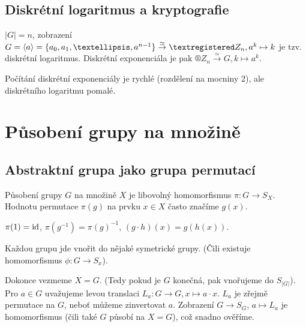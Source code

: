 \documentclass[12pt]{article}                   %
\begin{document}
    \subsection{Diskrétní logaritmus a kryptografie}
        \begin{definice}
            $|G| = n$, zobrazení $G = \<a\> = \{a_0, a_1, …, a^{n-1}\} \overset{\simeq}{\rightarrow} ®Z_n, a^k \mapsto k$ je tzv. diskrétní logaritmus. Diskrétní exponenciála je pak $®Z_n \overset{\simeq}{\rightarrow} G, k \mapsto a^k$.
        \end{definice}

        \begin{poznamka}
            Počítání diskrétní exponenciály je rychlé (rozdělení na mocniny 2), ale diskrétního logaritmu pomalé.
        \end{poznamka}


\section{Působení grupy na množině}
    \subsection{Abstraktní grupa jako grupa permutací}
        \begin{definice}
            Působení grupy $G$ na množině $X$ je libovolný homomorfismus $\pi: G \rightarrow S_X$. Hodnotu permutace $\pi(g)$ na prvku $x \in X$ často značíme $g(x)$.

            \begin{dusledekin}
                $\pi(1) = \operatorname{id}$, $\pi(g^{-1}) = \pi(g)^{-1}$, $(g·h)(x) = g(h(x))$.
            \end{dusledekin}
        \end{definice}

        \begin{veta}
            Každou grupu jde vnořit do nějaké symetrické grupy. (Čili existuje homomorfismus $\phi: G \rightarrow S_x$).

            \begin{dukazin}
                Dokonce vezmeme $X = G$. (Tedy pokud je $G$ konečná, pak vnořujeme do $S_{|G|}$). Pro $a \in G$ uvažujeme levou translaci $L_a: G \rightarrow G, x \mapsto a·x$. $L_a$ je zřejmě permutace na $G$, neboť můžeme zinvertovat $a$. Zobrazení $G \rightarrow S_G$, $a \mapsto L_a$ je homomorfismus (čili také $G$ působí na $X = G$), což snadno ověříme.
            \end{dukazin}
        \end{veta}
\end{document}
